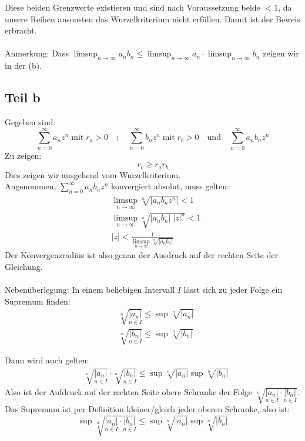 \documentclass[a4paper,german,12pt,smallheadings]{scrartcl}
\begin{document}
Diese beiden Grenzwerte existieren und sind nach Voraussetzung beide $<1$, da unsere Reihen ansonsten das Wurzelkriterium nicht erfüllen. Damit ist der Beweis erbracht.\\
\\
Anmerkung: Dass $\limsup_{n \to \infty} a_nb_n \leq \limsup_{n \to \infty} a_n \cdot \limsup_{n \to \infty} b_n$ zeigen wir in der (b).

\subsection*{Teil b}

Gegeben sind:
\begin{equation*}
\sum\limits_{n=0}^{\infty} a_n z^n \; \text{mit} \; r_a>0\quad ; \quad \sum\limits_{n=0}^{\infty} b_n z^n \; \text{mit} \; r_b>0 \quad \text{und} \quad  \sum\limits_{n=0}^{\infty} a_n b_n z^n
\end{equation*}
Zu zeigen:
\begin{equation*}
r_c \geq r_a r_b
\end{equation*}
Dies zeigen wir ausgehend vom Wurzelkriterium.\\
Angenommen, $\sum\limits_{n=0}^{\infty} a_n b_n z^n$ konvergiert absolut, muss gelten:
\begin{align*}
  & \limsup\limits_{n \to \infty} \sqrt[n]{|a_n b_n z^n|} < 1 \\
  & \limsup\limits_{n \to \infty} \sqrt[n]{|a_n b_n| \; |z|^n} < 1\\
  & |z| < \frac{1}{\limsup\limits_{n \to \infty} \sqrt[n]{|a_n b_n|}}
\end{align*}
Der Konvergenzradius ist also genau der Ausdruck auf der rechten Seite der Gleichung.\\
\\
Nebenüberlegung: In einem beliebigen Intervall $I$ lässt sich zu jeder Folge ein Supremum finden:
\begin{align*}
  & \sqrt[n]{\underset{n \in I}{|a_n|}} \leq \sup \sqrt[n]{|a_n|}\\
  & \sqrt[n]{\underset{n \in I}{|b_n|}} \leq \sup \sqrt[n]{|b_n|}
\end{align*}

Dann wird auch gelten:
\begin{align*} 
  & \sqrt[n]{\underset{n \in I}{|a_n|}} \cdot \sqrt[n]{\underset{n \in I}{|b_n|}} \leq \sup \sqrt[n]{|a_n|} \sup \sqrt[n]{|b_n|}
\end{align*}
Also ist der Aufdruck auf der rechten Seite obere Schranke der Folge $\sqrt[n]{\underset{n \in I}{|a_n|} \cdot \underset{n \in I}{|b_n|}}$. Das Supremum ist per Definition kleiner/gleich jeder oberen Schranke, also ist:
\begin{equation*}
\sup \sqrt[n]{\underset{n \in I}{|a_n|} \cdot \underset{n \in I}{|b_n|}} \leq \sup \sqrt[n]{|a_n|} \sup \sqrt[n]{|b_n|}
\end{equation*}
\end{document}
